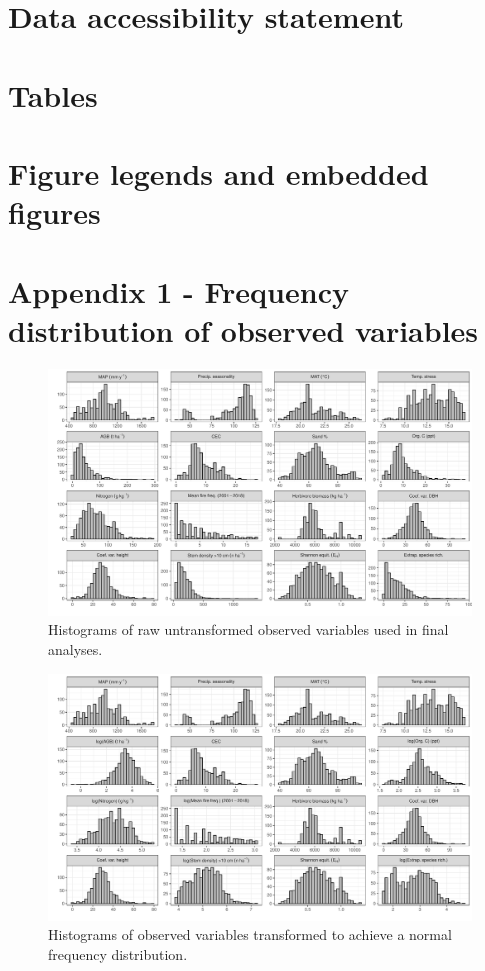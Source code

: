 \documentclass[11pt,a4paper]{article}
\begin{document}


\newpage{}
\appendix{}

\section{Data accessibility statement}

\section{Tables}

\section{Figure legends and embedded figures}

\section{Appendix 1 - Frequency distribution of observed variables} \label{appendixa}

\begin{figure}[H]
\centering
	\includegraphics[width=\textwidth]{hist_raw}
	\caption{Histograms of raw untransformed observed variables used in final analyses.}
	\label{hist_raw}
\end{figure}

\begin{figure}[H]
\centering
	\includegraphics[width=\textwidth]{hist_trans}
	\caption{Histograms of observed variables transformed to achieve a normal frequency distribution.}
	\label{hist_trans}
\end{figure}
\end{document}
